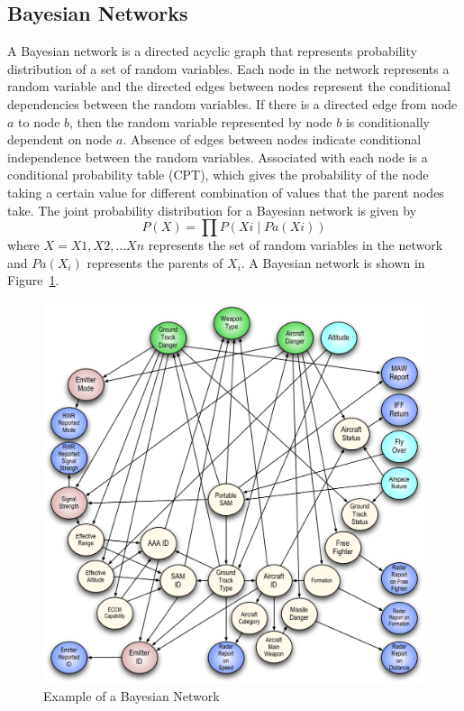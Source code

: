 \documentclass[12pt,a4paper]{article}
\begin{document}
\subsection{Bayesian Networks}
A Bayesian network is a directed acyclic graph that represents
probability distribution of a set of random variables. Each node in
the network represents a random variable and the directed edges
between nodes represent the conditional dependencies between the
random variables. If there is a directed edge from node $a$ to node
$b$, then the random variable represented by node $b$ is conditionally
dependent on node $a$. Absence of edges between nodes indicate
conditional independence between the random variables. Associated with
each node is a conditional probability table (CPT), which gives the
probability of the node taking a certain value for different
combination of values that the parent nodes take. The joint
probability distribution for a Bayesian network is given by
\[ P(X) = \prod P(Xi \mid Pa(Xi)) \]
%
where $X = X1,X2, \ldots Xn$ represents the set of random variables in
the network and $Pa(X_i)$ represents the parents of $X_i$. A Bayesian
network is shown in Figure~\ref{fig:bayes}.
\begin{figure}[H]
  \centering
  \includegraphics[scale=.25]{bn_wisepilot.jpg}
  \caption{Example of a Bayesian Network}
  \label{fig:bayes}
\end{figure}
\end{document}
